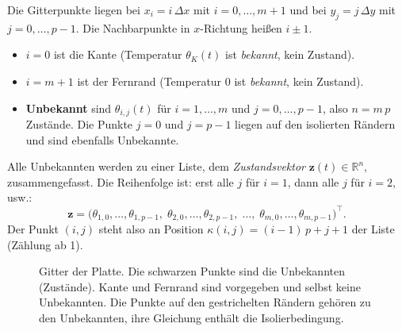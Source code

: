 \documentclass[11pt,a4paper]{article}
\numberwithin{equation}{section}
\newcommand{\dx}{\Delta x}
\newcommand{\dy}{\Delta y}
\newcommand{\thK}{\theta_{K}}
\newcommand{\vz}{\mathbf{z}}
\newcommand{\Rn}{\mathbb{R}}
\begin{document}
Die Gitterpunkte liegen bei $x_i=i\,\dx$ mit $i=0,\dots,m+1$ und bei $y_j=j\,\dy$ mit $j=0,\dots,p-1$. Die Nachbarpunkte in $x$-Richtung heißen $i\pm1$.
\begin{itemize}
 \item $i=0$ ist die Kante (Temperatur $\thK(t)$ ist \emph{bekannt}, kein Zustand).
 \item $i=m+1$ ist der Fernrand (Temperatur $0$ ist \emph{bekannt}, kein Zustand).
 \item \textbf{Unbekannt} sind $\theta_{i,j}(t)$ für $i=1,\dots,m$ und $j=0,\dots,p-1$, also $n=m\,p$ Zustände. Die Punkte $j=0$ und $j=p-1$ liegen auf den isolierten Rändern und sind ebenfalls Unbekannte.
\end{itemize}
Alle Unbekannten werden zu einer Liste, dem \emph{Zustandsvektor} $\vz(t)\in\Rn^n$, zusammengefasst. Die Reihenfolge ist: erst alle $j$ für $i=1$, dann alle $j$ für $i=2$, usw.:
\begin{equation}
 \vz=\bigl(\theta_{1,0},\dots,\theta_{1,p-1},\;\theta_{2,0},\dots,\theta_{2,p-1},\;\dots,\;\theta_{m,0},\dots,\theta_{m,p-1}\bigr)^{\!\top}.
\end{equation}
Der Punkt $(i,j)$ steht also an Position $\kappa(i,j)=(i-1)\,p+j+1$ der Liste (Zählung ab 1).

\begin{figure}[ht]
\centering
{}
\caption{Gitter der Platte. Die schwarzen Punkte sind die Unbekannten (Zustände). Kante und Fernrand sind vorgegeben und selbst keine Unbekannten. Die Punkte auf den gestrichelten Rändern gehören zu den Unbekannten, ihre Gleichung enthält die Isolierbedingung.}
\end{figure}
\end{document}
